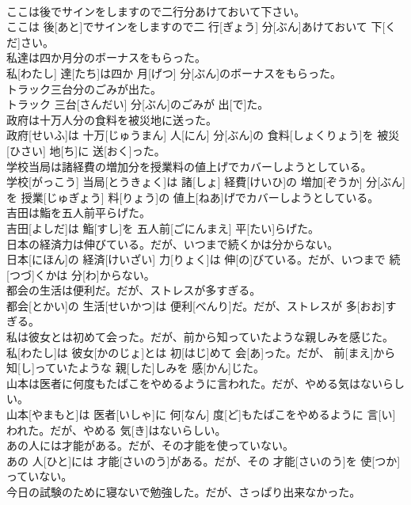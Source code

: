 \documentclass[8pt]{extreport}
\begin{document}
\begin{CJK}{UTF8}{min}
\\	ここは後でサインをしますので二行分あけておいて下さい。	
\\	ここは 後[あと]でサインをしますので二 行[ぎょう] 分[ぶん]あけておいて 下[くだ]さい。
\\	私達は四か月分のボーナスをもらった。	
\\	私[わたし] 達[たち]は四か 月[げつ] 分[ぶん]のボーナスをもらった。
\\	トラック三台分のごみが出た。	
\\	トラック 三台[さんだい] 分[ぶん]のごみが 出[で]た。
\\	政府は十万人分の食料を被災地に送った。	
\\	政府[せいふ]は 十万[じゅうまん] 人[にん] 分[ぶん]の 食料[しょくりょう]を 被災[ひさい] 地[ち]に 送[おく]った。
\\	学校当局は諸経費の増加分を授業料の値上げでカバーしようとしている。	
\\	学校[がっこう] 当局[とうきょく]は 諸[しょ] 経費[けいひ]の 増加[ぞうか] 分[ぶん]を 授業[じゅぎょう] 料[りょう]の 値上[ねあ]げでカバーしようとしている。
\\	吉田は鮨を五人前平らげた。	
\\	吉田[よしだ]は 鮨[すし]を 五人前[ごにんまえ] 平[たい]らげた。
\\	日本の経済力は伸びている。だが、いつまで続くかは分からない。	
\\	日本[にほん]の 経済[けいざい] 力[りょく]は 伸[の]びている。だが、いつまで 続[つづ]くかは 分[わ]からない。
\\	都会の生活は便利だ。だが、ストレスが多すぎる。	
\\	都会[とかい]の 生活[せいかつ]は 便利[べんり]だ。だが、ストレスが 多[おお]すぎる。
\\	私は彼女とは初めて会った。だが、前から知っていたような親しみを感じた。	
\\	私[わたし]は 彼女[かのじょ]とは 初[はじ]めて 会[あ]った。だが、 前[まえ]から 知[し]っていたような 親[した]しみを 感[かん]じた。
\\	山本は医者に何度もたばこをやめるように言われた。だが、やめる気はないらしい。	
\\	山本[やまもと]は 医者[いしゃ]に 何[なん] 度[ど]もたばこをやめるように 言[い]われた。だが、やめる 気[き]はないらしい。
\\	あの人には才能がある。だが、その才能を使っていない。	
\\	あの 人[ひと]には 才能[さいのう]がある。だが、その 才能[さいのう]を 使[つか]っていない。
\\	今日の試験のために寝ないで勉強した。だが、さっぱり出来なかった。	

\end{CJK}
\end{document}
